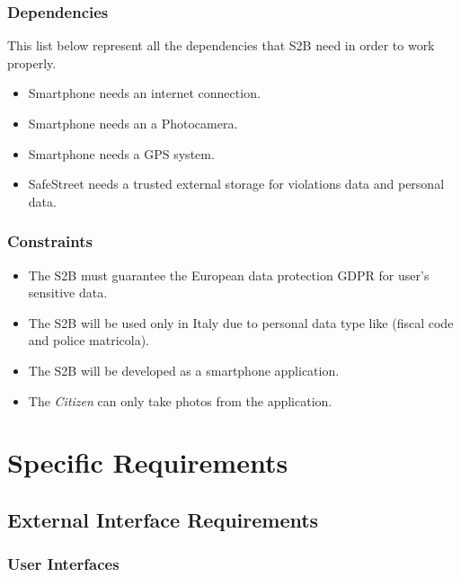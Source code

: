 \documentclass{article}
\begin{document}
\subsubsection{Dependencies}
This list below represent all the dependencies that S2B need in order to work properly.
\begin{itemize}
    \item Smartphone needs an internet connection.
    \item Smartphone needs an a Photocamera.
    \item Smartphone needs a GPS system.
    \item SafeStreet needs a trusted external storage for violations data and personal data.
\end{itemize}

\subsubsection{Constraints}
\begin{itemize}
    \item The S2B must guarantee the European data protection GDPR for user's sensitive data.
    \item The S2B will be used only in Italy due to personal data type like (fiscal code and police matricola).
    \item The S2B will be developed as a smartphone application.
    \item The \textit{Citizen} can only take photos from the application. 
\end{itemize}

\clearpage
\section{Specific Requirements}

\subsection{External Interface Requirements}
\subsubsection{User Interfaces}
\end{document}
